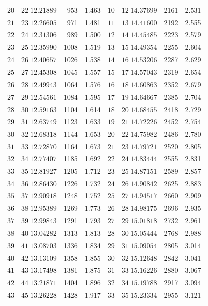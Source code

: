 \begin{center}
\begin{tabular}{|r|r|r|r||r|r|r|r|}
\(20\)&\(22\;12.21889\)&953&1.463&\(10\)&\(12\;14.37699\)&2161&2.531\\
\(21\)&\(23\;12.26605\)&971&1.481&\(11\)&\(13\;14.41600\)&2192&2.555\\
\(22\)&\(24\;12.31306\)&989&1.500&\(12\)&\(14\;14.45485\)&2223&2.579\\
\(23\)&\(25\;12.35990\)&1008&1.519&\(13\)&\(15\;14.49354\)&2255&2.604\\
\(24\)&\(26\;12.40657\)&1026&1.538&\(14\)&\(16\;14.53206\)&2287&2.629\\
\(25\)&\(27\;12.45308\)&1045&1.557&\(15\)&\(17\;14.57043\)&2319&2.654\\
\(26\)&\(28\;12.49943\)&1064&1.576&\(16\)&\(18\;14.60863\)&2352&2.679\\
\(27\)&\(29\;12.54561\)&1084&1.595&\(17\)&\(19\;14.64667\)&2385&2.704\\
\(28\)&\(30\;12.59163\)&1104&1.614&\(18\)&\(20\;14.68455\)&2418&2.729\\
\(29\)&\(31\;12.63749\)&1123&1.633&\(19\)&\(21\;14.72226\)&2452&2.754\\[3pt]
\(30\)&\(32\;12.68318\)&1144&1.653&\(20\)&\(22\;14.75982\)&2486&2.780\\
\(31\)&\(33\;12.72870\)&1164&1.673&\(21\)&\(23\;14.79721\)&2520&2.805\\
\(32\)&\(34\;12.77407\)&1185&1.692&\(22\)&\(24\;14.83444\)&2555&2.831\\
\(33\)&\(35\;12.81927\)&1205&1.712&\(23\)&\(25\;14.87151\)&2589&2.857\\
\(34\)&\(36\;12.86430\)&1226&1.732&\(24\)&\(26\;14.90842\)&2625&2.883\\
\(35\)&\(37\;12.90918\)&1248&1.752&\(25\)&\(27\;14.94517\)&2660&2.909\\
\(36\)&\(38\;12.95389\)&1269&1.773&\(26\)&\(28\;14.98175\)&2696&2.935\\
\(37\)&\(39\;12.99843\)&1291&1.793&\(27\)&\(29\;15.01818\)&2732&2.961\\
\(38\)&\(40\;13.04282\)&1313&1.813&\(28\)&\(30\;15.05444\)&2768&2.988\\
\(39\)&\(41\;13.08703\)&1336&1.834&\(29\)&\(31\;15.09054\)&2805&3.014\\[3pt]
\(40\)&\(42\;13.13109\)&1358&1.855&\(30\)&\(32\;15.12648\)&2842&3.041\\
\(41\)&\(43\;13.17498\)&1381&1.875&\(31\)&\(33\;15.16226\)&2880&3.067\\
\(42\)&\(44\;13.21871\)&1404&1.896&\(32\)&\(34\;15.19788\)&2917&3.094\\
\(43\)&\(45\;13.26228\)&1428&1.917&\(33\)&\(35\;15.23334\)&2955&3.121\\

\end{tabular}
\end{center}
